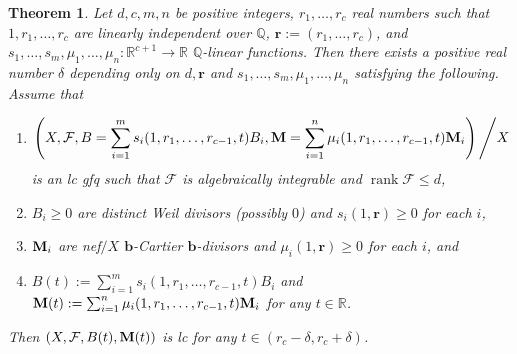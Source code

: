 \documentclass[11pt]{amsart}
\numberwithin{equation}{section}
\newcommand{\bb}{\bm{b}}
\newcommand{\Mm}{{\bf{M}}}
\newcommand{\rk}{\operatorname{rank}}
\newcommand{\Ff}{\mathcal{F}}
\newtheorem{thm}{Theorem}[subsection]
\theoremstyle{definition}
\theoremstyle{definition}
\theoremstyle{definition}
\begin{document}
\begin{thm}\label{thm: uniform rational polytope foliation one variable}
Let $d,c,m,n$ be positive integers, $r_1,\dots,r_c$ real numbers such that $1,r_1,\dots,r_c$ are linearly independent over $\mathbb Q$, $\bm{r}:=(r_1,\dots,r_c)$, and $s_1,\dots,s_m,\mu_1,\dots,\mu_n: \mathbb R^{c+1}\rightarrow\mathbb R$ $\mathbb Q$-linear functions. Then there exists a positive real number $\delta$ depending only on $d,\bm{r}$ and $s_1,\dots,s_m,\mu_1,\dots,\mu_n$ satisfying the following. Assume that
\begin{enumerate}
    \item 
    $$\left(X,\Ff,B=\sum_{i=1}^ms_i(1,r_1,\dots,r_{c-1},t)B_i,\Mm=\sum_{i=1}^n\mu_i(1,r_1,\dots,r_{c-1},t)\Mm_i\right)\Bigg/X$$ is an lc gfq such that $\Ff$ is algebraically integrable and $\rk\Ff\leq d$,
    \item $B_i\geq 0$ are distinct Weil divisors (possibly $0$) and $s_i(1,\bm{r})\geq 0$ for each $i$,
    \item $\Mm_i$ are nef$/X$ $\bb$-Cartier $\bb$-divisors and $\mu_i(1,\bm{r})\geq 0$ for each $i$, and
    \item $B(t):=\sum_{i=1}^ms_i(1,r_1,\dots,r_{c-1},t)B_i$ and  $\Mm(t):=\sum_{i=1}^n\mu_i(1,r_1,\dots,r_{c-1},t)\Mm_i$ for any $t\in\mathbb R$.
\end{enumerate}
Then $(X,\Ff,B(t),\Mm(t))$ is lc for any $t\in (r_c-\delta,r_c+\delta)$.
\end{thm}
\end{document}
